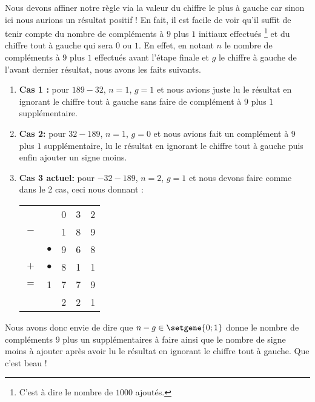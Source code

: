 Nous devons affiner notre règle via la valeur du chiffre le plus à gauche car sinon ici nous aurions un résultat positif !
En fait, il est facile de voir qu'il suffit de tenir compte du nombre de compléments à $9$ plus $1$ initiaux effectués
\footnote{
	C'est à dire le nombre de $1000$ ajoutés.
}
et du chiffre tout à gauche qui sera $0$ ou $1$.
En effet, en notant $n$ le nombre de compléments à $9$ plus $1$ effectués avant l'étape finale et $g$ le chiffre à gauche de l'avant dernier résultat, nous avons les faits suivants.

\begin{enumerate}
	\item \textbf{Cas 1 :} pour $189 - 32$, $n = 1$, $g = 1$ et nous avions juste lu le résultat en ignorant le chiffre tout à gauche sans faire de complément à $9$ plus $1$ supplémentaire.


	\item \textbf{Cas 2:} pour $32 - 189$, $n = 1$, $g = 0$ et nous avions fait un complément à $9$ plus $1$ supplémentaire, lu le résultat en ignorant le chiffre tout à gauche puis enfin ajouter un signe moins.


	\item \textbf{Cas 3 actuel:} pour $-32 - 189$, $n = 2$, $g = 1$ et nous devons faire comme dans le 2\ieme{} cas, ceci nous donnant :

    \begin{center}
    \begin{tabular}{ccccc}
    	    & \sign{-}  & 0 & 3 & 2 \\
    	$-$ &           & 1 & 8 & 9 \\
    	\hline
    	\hline
    	    & $\bullet$ & 9 & 6 & 8 \\
    	$+$ & $\bullet$ & 8 & 1 & 1 \\
    	\hline
        $=$ & 1         & 7 & 7 & 9 \\
    	\hline
    	\hline
            & \sign{-}  & 2 & 2 & 1 \\
    \end{tabular}
    \end{center}
\end{enumerate}


Nous avons donc envie de dire que $n - g \in \setgene{0 ; 1}$ donne le nombre de compléments $9$ plus un supplémentaires à faire ainsi que le nombre de signe moins à ajouter après avoir lu le résultat en ignorant le chiffre tout à gauche. Que c'est beau !

\smallskip

